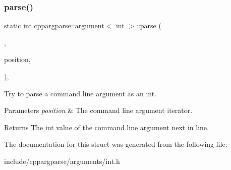 \subsubsection{\texorpdfstring{parse()}{parse()}}
{\footnotesize\ttfamily static int \hyperlink{structcppargparse_1_1argument}{cppargparse\+::argument}$<$ int $>$\+::parse (\begin{DoxyParamCaption}\item[{const \hyperlink{types_8h_a80adf2418b7ce9fe616698efa7533ecf}{types\+::\+Command\+Line\+\_\+t} \&}]{,  }\item[{const \hyperlink{types_8h_a43b4f43f8940de1bf09ced6f1b668053}{types\+::\+Command\+Line\+Position\+\_\+t} \&}]{position,  }\item[{const \hyperlink{types_8h_a003c660afe2ee9c6cc39aea966e8926d}{types\+::\+Command\+Line\+Arguments\+\_\+t} \&}]{ }\end{DoxyParamCaption})\hspace{0.3cm}{\ttfamily [inline]}, {\ttfamily [static]}}



Try to parse a command line argument as an int. 


\begin{DoxyParams}{Parameters}
{\em position} & The command line argument iterator.\\
\hline
\end{DoxyParams}
\begin{DoxyReturn}{Returns}
The int value of the command line argument next in line. 
\end{DoxyReturn}


The documentation for this struct was generated from the following file\+:\begin{DoxyCompactItemize}
\item 
include/cppargparse/arguments/int.\+h\end{DoxyCompactItemize}
